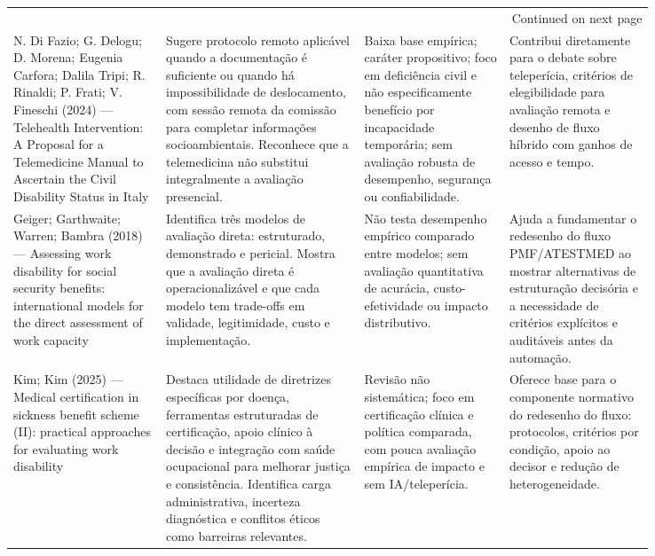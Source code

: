 \documentclass[12pt,a4paper]{article}
\begin{document}
\begin{landscape}
\begin{longtable}{p{0.20\linewidth}p{0.26\linewidth}p{0.19\linewidth}p{0.19\linewidth}}
\hline
\endhead
\hline\multicolumn{4}{r}{Continued on next page} \\
\endfoot
\endlastfoot
\hline
N. Di Fazio; G. Delogu; D. Morena; Eugenia Carfora; Dalila Tripi; R. Rinaldi; P. Frati; V. Fineschi (2024) — Telehealth Intervention: A Proposal for a Telemedicine Manual to Ascertain the Civil Disability Status in Italy & Sugere protocolo remoto aplicável quando a documentação é suficiente ou quando há impossibilidade de deslocamento, com sessão remota da comissão para completar informações socioambientais. Reconhece que a telemedicina não substitui integralmente a avaliação presencial. & Baixa base empírica; caráter propositivo; foco em deficiência civil e não especificamente benefício por incapacidade temporária; sem avaliação robusta de desempenho, segurança ou confiabilidade. & Contribui diretamente para o debate sobre teleperícia, critérios de elegibilidade para avaliação remota e desenho de fluxo híbrido com ganhos de acesso e tempo.\\
Geiger; Garthwaite; Warren; Bambra (2018) — Assessing work disability for social security benefits: international models for the direct assessment of work capacity & Identifica três modelos de avaliação direta: estruturado, demonstrado e pericial. Mostra que a avaliação direta é operacionalizável e que cada modelo tem trade-offs em validade, legitimidade, custo e implementação. & Não testa desempenho empírico comparado entre modelos; sem avaliação quantitativa de acurácia, custo-efetividade ou impacto distributivo. & Ajuda a fundamentar o redesenho do fluxo PMF/ATESTMED ao mostrar alternativas de estruturação decisória e a necessidade de critérios explícitos e auditáveis antes da automação.\\
Kim; Kim (2025) — Medical certification in sickness benefit scheme (II): practical approaches for evaluating work disability & Destaca utilidade de diretrizes específicas por doença, ferramentas estruturadas de certificação, apoio clínico à decisão e integração com saúde ocupacional para melhorar justiça e consistência. Identifica carga administrativa, incerteza diagnóstica e conflitos éticos como barreiras relevantes. & Revisão não sistemática; foco em certificação clínica e política comparada, com pouca avaliação empírica de impacto e sem IA/teleperícia. & Oferece base para o componente normativo do redesenho do fluxo: protocolos, critérios por condição, apoio ao decisor e redução de heterogeneidade.\\

\end{longtable}
\end{landscape}
\end{document}
